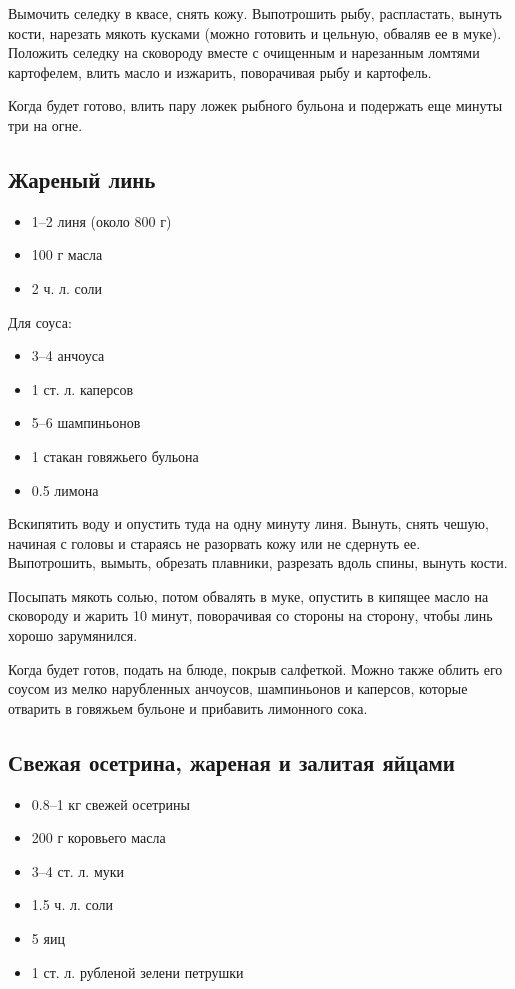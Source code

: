 Вымочить селедку в квасе, снять кожу. Выпотрошить рыбу, распластать, вынуть кости, нарезать мякоть кусками (можно готовить и цельную, обваляв ее в муке). Положить селедку на сковороду вместе с очищенным и нарезанным ломтями картофелем, влить масло и изжарить, поворачивая рыбу и картофель.

Когда будет готово, влить пару ложек рыбного бульона и подержать еще минуты три на огне.

\subsection{Жареный линь}

\begin{itemize} 
	\item  1–2 линя (около 800 г) 
    \item  100 г масла \item  2 ч. л. соли
\end{itemize}

Для соуса:

\begin{itemize} 
	\item  3–4 анчоуса 
    \item  1 ст. л. каперсов 
    \item  5–6 шампиньонов 
    \item  1 стакан говяжьего бульона 
    \item  0.5 лимона
\end{itemize}

Вскипятить воду и опустить туда на одну минуту линя. Вынуть, снять чешую, начиная с головы и стараясь не разорвать кожу или не сдернуть ее. Выпотрошить, вымыть, обрезать плавники, разрезать вдоль спины, вынуть кости.

Посыпать мякоть солью, потом обвалять в муке, опустить в кипящее масло на сковороду и жарить 10 минут, поворачивая со стороны на сторону, чтобы линь хорошо зарумянился.

Когда будет готов, подать на блюде, покрыв салфеткой. Можно также облить его соусом из мелко нарубленных анчоусов, шампиньонов и каперсов, которые отварить в говяжьем бульоне и прибавить лимонного сока.

\subsection{Свежая осетрина, жареная и залитая яйцами}

\begin{itemize} 
	\item  0.8–1 кг свежей осетрины 
    \item  200 г коровьего масла 
    \item  3–4 ст. л. муки 
    \item  1.5 ч. л. соли 
    \item  5 яиц 
    \item  1 ст. л. рубленой зелени петрушки
\end{itemize}

